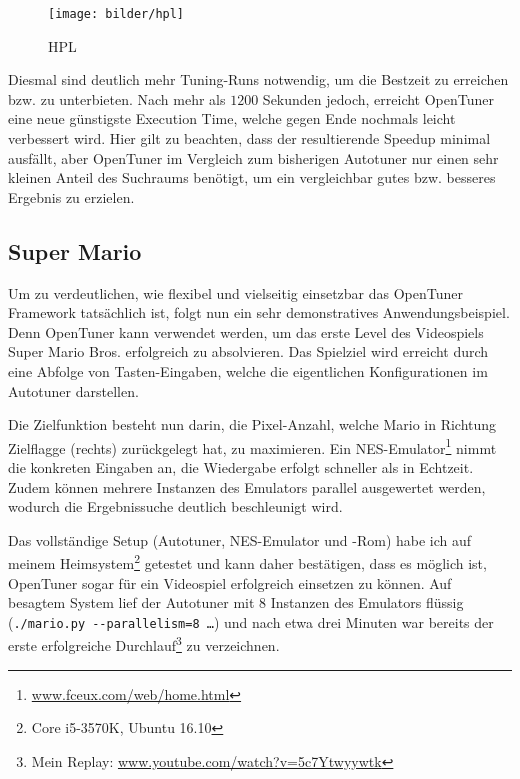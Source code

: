 \documentclass[a4paper,11pt]{scrartcl}
\newcommand{\bzw}{\mbox{bzw.}\xspace}
\begin{document}
\begin{figure}[h]
\begin{center}
\texttt{[image: bilder/hpl]}
\cite{OT-paper} \caption{HPL}
\end{center}
\end{figure}
Diesmal sind deutlich mehr Tuning-Runs notwendig, um die Bestzeit zu erreichen \bzw zu unterbieten.
Nach mehr als $1200$ Sekunden jedoch, erreicht OpenTuner eine neue günstigste Execution Time,
welche gegen Ende nochmals leicht verbessert wird. Hier gilt zu beachten, dass der resultierende
Speedup minimal ausfällt, aber OpenTuner im Vergleich zum bisherigen Autotuner nur einen 
sehr kleinen Anteil des Suchraums benötigt, um ein vergleichbar gutes \bzw besseres Ergebnis 
zu erzielen.

\subsection{Super Mario}
Um zu verdeutlichen, wie flexibel und vielseitig einsetzbar das OpenTuner Framework tatsächlich ist,
folgt nun ein sehr demonstratives Anwendungsbeispiel. Denn OpenTuner kann verwendet werden,
um das erste Level des Videospiels Super Mario Bros. erfolgreich zu absolvieren.
Das Spielziel wird erreicht durch eine Abfolge von Tasten-Eingaben, welche die eigentlichen
Konfigurationen im Autotuner darstellen. \newline

Die Zielfunktion besteht nun darin, die Pixel-Anzahl, welche Mario in Richtung Zielflagge (rechts)
zurückgelegt hat, zu maximieren. Ein NES-Emulator\footnote{\url{www.fceux.com/web/home.html}}
nimmt die konkreten Eingaben an, die Wiedergabe erfolgt schneller als in Echtzeit. Zudem können
mehrere Instanzen des Emulators parallel ausgewertet werden, wodurch die Ergebnissuche 
deutlich beschleunigt wird. \newline

Das vollständige Setup (Autotuner, NES-Emulator und -Rom) habe ich auf meinem 
Heimsystem\footnote{Core i5-3570K, Ubuntu 16.10} getestet und kann daher 
bestätigen, dass es möglich ist, OpenTuner sogar für ein Videospiel erfolgreich
einsetzen zu können. Auf besagtem System lief der Autotuner mit 8 Instanzen des
Emulators flüssig (\texttt{./mario.py -{}-parallelism=8 \ldots}) und nach etwa drei Minuten
war bereits der erste erfolgreiche Durchlauf\footnote{Mein Replay: \url{www.youtube.com/watch?v=5c7Ytwyywtk}} zu verzeichnen. \newline
\end{document}
